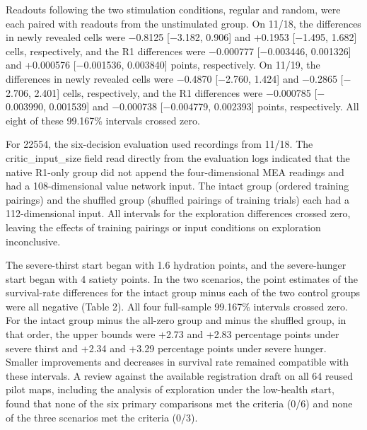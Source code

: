 \documentclass{article}
\begin{document}
Readouts following the two stimulation conditions, regular and random, were each paired with readouts from the unstimulated group. On 11/18, the differences in newly revealed cells were \ensuremath{-}0.8125 [\ensuremath{-}3.182, 0.906] and +0.1953 [\ensuremath{-}1.495, 1.682] cells, respectively, and the R1 differences were \ensuremath{-}0.000777 [\ensuremath{-}0.003446, 0.001326] and +0.000576 [\ensuremath{-}0.001536, 0.003840] points, respectively. On 11/19, the differences in newly revealed cells were \ensuremath{-}0.4870 [\ensuremath{-}2.760, 1.424] and \ensuremath{-}0.2865 [\ensuremath{-}2.706, 2.401] cells, respectively, and the R1 differences were \ensuremath{-}0.000785 [\ensuremath{-}0.003990, 0.001539] and \ensuremath{-}0.000738 [\ensuremath{-}0.004779, 0.002393] points, respectively. All eight of these 99.167\% intervals crossed zero.


For 22554, the six-decision evaluation used recordings from 11/18. The critic\_\allowbreak{}input\_\allowbreak{}size field read directly from the evaluation logs indicated that the native R1-only group did not append the four-dimensional MEA readings and had a 108-dimensional value network input. The intact group (ordered training pairings) and the shuffled group (shuffled pairings of training trials) each had a 112-dimensional input. All intervals for the exploration differences crossed zero, leaving the effects of training pairings or input conditions on exploration inconclusive.


The severe-thirst start began with 1.6 hydration points, and the severe-hunger start began with 4 satiety points. In the two scenarios, the point estimates of the survival-rate differences for the intact group minus each of the two control groups were all negative (Table 2). All four full-sample 99.167\% intervals crossed zero. For the intact group minus the all-zero group and minus the shuffled group, in that order, the upper bounds were +2.73 and +2.83 percentage points under severe thirst and +2.34 and +3.29 percentage points under severe hunger. Smaller improvements and decreases in survival rate remained compatible with these intervals. A review against the available registration draft on all 64 reused pilot maps, including the analysis of exploration under the low-health start, found that none of the six primary comparisons met the criteria (0/6) and none of the three scenarios met the criteria (0/3).
\end{document}
